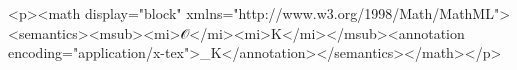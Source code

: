 <p><math display="block" xmlns="http://www.w3.org/1998/Math/MathML"><semantics><msub><mi>𝒪</mi><mi>K</mi></msub><annotation encoding="application/x-tex">_{K}</annotation></semantics></math></p>

